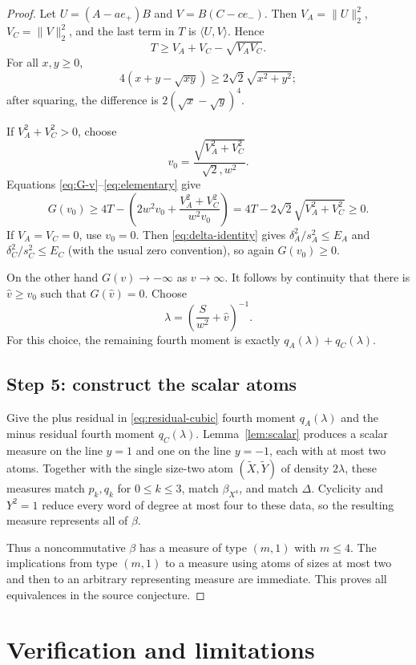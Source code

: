 \documentclass[11pt]{article}
\newcommand{\ip}[2]{\langle #1,#2\rangle}
\begin{document}
\begin{proof}
Let $U=(A-ae_+)B$ and $V=B(C-ce_-)$.  Then
$V_A=\|U\|_2^2$, $V_C=\|V\|_2^2$, and the last term in $T$ is
$\ip{U}{V}$.  Hence
\[
 T\geq V_A+V_C-\sqrt{V_AV_C}.
\]
For all $x,y\geq0$,
\begin{equation}\label{eq:elementary}
 4(x+y-\sqrt{xy})\geq2\sqrt2\sqrt{x^2+y^2};
\end{equation}
after squaring, the difference is $2(\sqrt x-\sqrt y)^4$.

If $V_A^2+V_C^2>0$, choose
\[
 v_0=\frac{\sqrt{V_A^2+V_C^2}}{\sqrt2,w^2}.
\]
Equations \eqref{eq:G-v}--\eqref{eq:elementary} give
\[
 G(v_0)\geq
 4T-\left(2w^2v_0+\frac{V_A^2+V_C^2}{w^2v_0}\right)
 =4T-2\sqrt2\sqrt{V_A^2+V_C^2}\geq0.
\]
If $V_A=V_C=0$, use $v_0=0$.  Then
\eqref{eq:delta-identity} gives
$\delta_A^2/s_A^2\leq E_A$ and
$\delta_C^2/s_C^2\leq E_C$ (with the usual zero convention), so again
$G(v_0)\geq0$.

On the other hand $G(v)\to-\infty$ as $v\to\infty$.  It follows by
continuity that there is $\widehat v\geq v_0$ such that
$G(\widehat v)=0$.  Choose
\[
 \lambda=\left(\frac S{w^2}+\widehat v\right)^{-1}.
\]
For this choice, the remaining fourth moment is exactly
$q_A(\lambda)+q_C(\lambda)$.

\subsection*{Step 5: construct the scalar atoms}

Give the plus residual in \eqref{eq:residual-cubic} fourth moment
$q_A(\lambda)$ and the minus residual fourth moment $q_C(\lambda)$.
Lemma~\ref{lem:scalar} produces a scalar measure on the line $y=1$ and one
on the line $y=-1$, each with at most two atoms.  Together with the single
size-two atom $(\widetilde X,\widetilde Y)$ of density $2\lambda$, these
measures match $p_k,q_k$ for $0\leq k\leq3$, match $\beta_{X^4}$, and match
$\Delta$.  Cyclicity and $Y^2=1$ reduce every word of degree at most four to
these data, so the resulting measure represents all of $\beta$.

Thus a noncommutative $\beta$ has a measure of type $(m,1)$ with $m\leq4$.
The implications from type $(m,1)$ to a measure using atoms of sizes at most
two and then to an arbitrary representing measure are immediate.  This proves
all equivalences in the source conjecture.
\end{proof}

\section{Verification and limitations}
\end{document}
